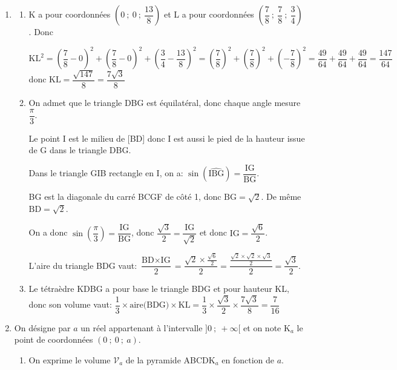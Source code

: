 \begin{enumerate}
\begin{enumerate}
Donc le point L est le projeté orthogonal du point K sur le plan (BDG).
	\end{enumerate}

\item 
	\begin{enumerate}
		\item
K a pour coordonnées $\left(0~;~0~;~\dfrac{13}{8}\right)$ et L a pour coordonnées $\left(\dfrac78~;~\dfrac78~;~\dfrac34\right)$. Donc

$\text{KL}^2 = \left (\dfrac{7}{8}-0 \right )^2 + \left ( \dfrac{7}{8}-0 \right )^2 + \left ( \dfrac{3}{4} - \dfrac{13}{8}\right )^2
= \left (\dfrac{7}{8}\right )^2 + \left ( \dfrac{7}{8}\right )^2 + \left (  - \dfrac{7}{8}\right )^2
= \dfrac{49}{64} + \dfrac{49}{64} + \dfrac{49}{64}
= \dfrac{147}{64}$\\
donc $\text{KL} = \dfrac{\sqrt{147}}{8}=\dfrac{7\sqrt{3}}{8}$
		
		\item On admet que le triangle DBG est équilatéral, donc chaque angle mesure $\dfrac{\pi}{3}$.

Le point I est le milieu de [BD] donc I est aussi le pied de la hauteur issue de G dans le triangle DBG.

Dans le triangle GIB rectangle en I, on a:
$\sin \left ( \widehat{\text{IBG}} \right ) = \dfrac{\text{IG}}{\text{BG}}$.

BG est la diagonale du carré BCGF de côté 1, donc $\text{BG}=\sqrt{2}$.
De même $\text{BD}=\sqrt{2}$.
		
On a donc $\sin \left ( \dfrac{\pi}{3} \right ) = 	\dfrac{\text{IG}}{\text{BG}}$, donc $\dfrac{\sqrt{3}}{2}= \dfrac{\text{IG}}{\sqrt{2}}$ et donc $\text{IG} = \dfrac{\sqrt{6}}{2}$.

L'aire du triangle BDG vaut:
$\dfrac{\text{BD} \times \text{IG}}{2}=\dfrac{\sqrt{2}\times \frac{\sqrt{6}}{2}}{2}
= \dfrac{ \frac{\sqrt{2}\times \sqrt{2} \times \sqrt{3}}{2}}{2}= \dfrac{\sqrt{3}}{2}$.
		
		\item Le tétraèdre KDBG a pour base le triangle BDG et pour hauteur KL, donc son volume vaut:	
$\dfrac{1}{3}\times \text{aire(BDG)}\times \text{KL}
= \dfrac{1}{3}\times \dfrac{\sqrt{3}}{2}\times \dfrac{7\sqrt{3}}{8}
= \dfrac{7}{16}$		






\end{enumerate}

\item On désigne par $a$ un réel appartenant à l'intervalle $]0~;~+\infty[$ et on note K$_a$ le point de coordonnées $(0~;~0~;~a)$.
	\begin{enumerate}
		\item On exprime le volume $\mathcal{V}_a$ de la pyramide ABCDK$_a$ en fonction de $a$.
		

\end{enumerate}
\end{enumerate}
